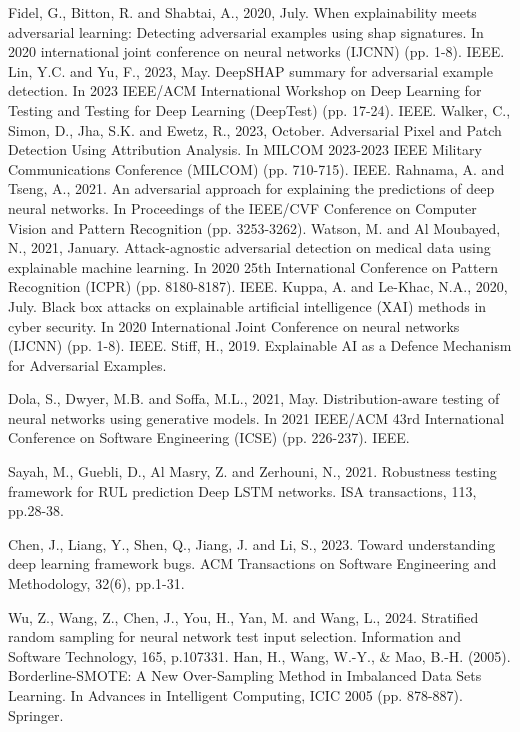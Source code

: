 \begin{singlespace}
\begin{thebibliography}{}
Fidel, G., Bitton, R. and Shabtai, A., 2020, July. When explainability meets adversarial learning: Detecting adversarial examples using shap signatures. In 2020 international joint conference on neural networks (IJCNN) (pp. 1-8). IEEE.
Lin, Y.C. and Yu, F., 2023, May. DeepSHAP summary for adversarial example detection. In 2023 IEEE/ACM International Workshop on Deep Learning for Testing and Testing for Deep Learning (DeepTest) (pp. 17-24). IEEE.
Walker, C., Simon, D., Jha, S.K. and Ewetz, R., 2023, October. Adversarial Pixel and Patch Detection Using Attribution Analysis. In MILCOM 2023-2023 IEEE Military Communications Conference (MILCOM) (pp. 710-715). IEEE.
Rahnama, A. and Tseng, A., 2021. An adversarial approach for explaining the predictions of deep neural networks. In Proceedings of the IEEE/CVF Conference on Computer Vision and Pattern Recognition (pp. 3253-3262).
Watson, M. and Al Moubayed, N., 2021, January. Attack-agnostic adversarial detection on medical data using explainable machine learning. In 2020 25th International Conference on Pattern Recognition (ICPR) (pp. 8180-8187). IEEE.
Kuppa, A. and Le-Khac, N.A., 2020, July. Black box attacks on explainable artificial intelligence (XAI) methods in cyber security. In 2020 International Joint Conference on neural networks (IJCNN) (pp. 1-8). IEEE.
Stiff, H., 2019. Explainable AI as a Defence Mechanism for Adversarial Examples.




Dola, S., Dwyer, M.B. and Soffa, M.L., 2021, May. Distribution-aware testing of neural networks using generative models. In 2021 IEEE/ACM 43rd International Conference on Software Engineering (ICSE) (pp. 226-237). IEEE.

Sayah, M., Guebli, D., Al Masry, Z. and Zerhouni, N., 2021. Robustness testing framework for RUL prediction Deep LSTM networks. ISA transactions, 113, pp.28-38.

Chen, J., Liang, Y., Shen, Q., Jiang, J. and Li, S., 2023. Toward understanding deep learning framework bugs. ACM Transactions on Software Engineering and Methodology, 32(6), pp.1-31.


     Wu, Z., Wang, Z., Chen, J., You, H., Yan, M. and Wang, L., 2024. Stratified random sampling for neural network test input selection. Information and Software Technology, 165, p.107331.
     Han, H., Wang, W.-Y., \& Mao, B.-H. (2005). Borderline-SMOTE: A New Over-Sampling Method in Imbalanced Data Sets Learning. In Advances in Intelligent Computing, ICIC 2005 (pp. 878-887). Springer.


\end{thebibliography}
\end{singlespace}

